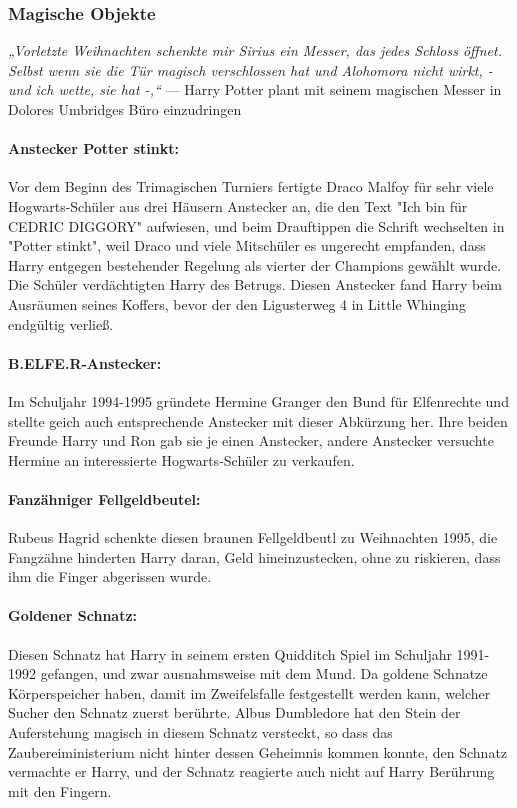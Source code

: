 \documentclass[a4paper, 10pt]{article}
\begin{document}
\subsubsection*{\large Magische Objekte}
\textit{„Vorletzte Weihnachten schenkte mir Sirius ein Messer, das jedes Schloss öffnet. Selbst wenn sie die Tür magisch verschlossen hat und Alohomora nicht wirkt, - und ich wette, sie hat -,“}
\vspace{10pt}
\newline
— Harry Potter plant mit seinem magischen Messer in Dolores Umbridges Büro einzudringen
\vspace{10pt}
\newline
\paragraph{Anstecker Potter stinkt:}

Vor dem Beginn des Trimagischen Turniers fertigte Draco Malfoy für sehr viele Hogwarts-Schüler aus drei Häusern Anstecker an, die den Text "Ich bin für CEDRIC DIGGORY" aufwiesen, und beim Drauftippen die Schrift wechselten in "Potter stinkt", weil Draco und viele Mitschüler es ungerecht empfanden, dass Harry entgegen bestehender Regelung als vierter der Champions gewählt wurde. Die Schüler verdächtigten Harry des Betrugs. Diesen Anstecker fand Harry beim Ausräumen seines Koffers, bevor der den Ligusterweg 4 in Little Whinging endgültig verließ.
\paragraph{B.ELFE.R-Anstecker:}
Im Schuljahr 1994-1995 gründete Hermine Granger den Bund für Elfenrechte und stellte geich auch entsprechende Anstecker mit dieser Abkürzung her. Ihre beiden Freunde Harry und Ron gab sie je einen Anstecker, andere Anstecker versuchte Hermine an interessierte Hogwarts-Schüler zu verkaufen.
\paragraph{Fanzähniger Fellgeldbeutel:}
Rubeus Hagrid schenkte diesen braunen Fellgeldbeutl zu Weihnachten 1995, die Fangzähne hinderten Harry daran, Geld hineinzustecken, ohne zu riskieren, dass ihm die Finger abgerissen wurde.
\paragraph{Goldener Schnatz:}
Diesen Schnatz hat Harry in seinem ersten Quidditch Spiel im Schuljahr 1991-1992 gefangen, und zwar ausnahmsweise mit dem Mund. Da goldene Schnatze Körperspeicher haben, damit im Zweifelsfalle festgestellt werden kann, welcher Sucher den Schnatz zuerst berührte. Albus Dumbledore hat den Stein der Auferstehung magisch in diesem Schnatz versteckt, so dass das Zaubereiministerium nicht hinter dessen Geheimnis kommen konnte, den Schnatz vermachte er Harry, und der Schnatz reagierte auch nicht auf Harry Berührung mit den Fingern.
\end{document}
